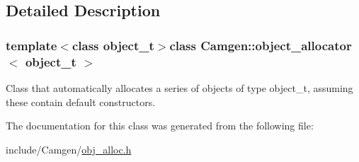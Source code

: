\subsection{Detailed Description}
\subsubsection*{template$<$class object\+\_\+t$>$class Camgen\+::object\+\_\+allocator$<$ object\+\_\+t $>$}

Class that automatically allocates a series of objects of type object\+\_\+t, assuming these contain default constructors. 



The documentation for this class was generated from the following file\+:\begin{DoxyCompactItemize}
\item 
include/\+Camgen/\hyperlink{a00704}{obj\+\_\+alloc.\+h}\end{DoxyCompactItemize}
